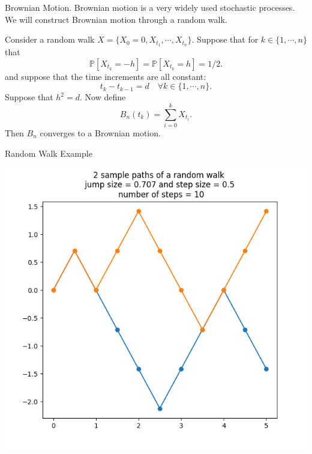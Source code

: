 \documentclass{beamer}%
\numberwithin{equation}{section}
\begin{document}
\begin{frame}{Brownian Motion.}
Brownian motion is a very widely used stochastic processes. We will construct Brownian motion through a random walk.

\begin{Theorem}
	Consider a random walk $X = \{X_{0}=0, X_{t_1}, \cdots, X_{t_n}\}$. Suppose that for $k \in \{1, \cdots ,n\}$ that
		\[
			\mathbb{P}\left[ X_{t_k} = -h \right] = \mathbb{P}\left[ X_{t_k} = h \right] = 1/2.
		\]
	and suppose that the time increments are all constant:
		\[
			t_k-t_{k-1} = d \quad \forall k \in \{ 1, \cdots, n \}.
		\]
	Suppose that $h^2 = d$. Now define 
		\[
			B_n(t_{k}) = \sum_{i=0}^k X_{t_i}.
		\]
	Then $B_n$ converges to a Brownian motion. 
\end{Theorem}
\end{frame}

\begin{frame}{Random Walk Example}
\begin{center}
\includegraphics[scale=.6]{randomwalk1.png}
\end{center}
\end{frame}
\end{document}
